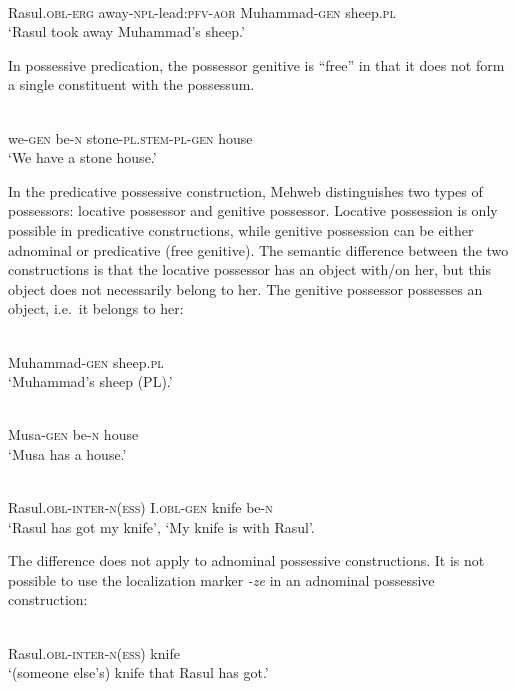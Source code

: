 ﻿\documentclass[output=paper]{langsci/langscibook}
\begin{document}
\ea
{}\\
Rasul.\textsc{obl}-\textsc{erg} away-\textsc{npl}-lead:\textsc{pfv}-\textsc{aor} Muhammad-\textsc{gen} sheep.\textsc{pl}\\
\glt `Rasul took away Muhammad's sheep.'
\z

In possessive predication, the possessor genitive is ``free'' in that it
does not form a single constituent with the possessum.

\ea
{}\\
we-\textsc{gen} be-\textsc{n} stone-\textsc{pl.stem}-\textsc{pl}-\textsc{gen} house\\
\glt `We have a stone house.'
\z

In the predicative possessive construction, Mehweb distinguishes two types
of possessors: locative possessor and genitive possessor. Locative
possession is only possible in predicative constructions, while genitive
possession can be either adnominal or predicative (free genitive). The
semantic difference between the two constructions is that the locative
possessor has an object with/on her, but this object does not
necessarily belong to her. The genitive possessor possesses an object,
i.e.\ it belongs to her:

\ea
{}\\
Muhammad-\textsc{gen} sheep.\textsc{pl}\\
\glt `Muhammad's sheep (PL).'

\ex
{}\\
Musa-\textsc{gen} be-\textsc{n} house\\
\glt `Musa has a house.'

\ex
{}\\
Rasul.\textsc{obl}-\textsc{inter}-\textsc{n}(\textsc{ess}) I.\textsc{obl}-\textsc{gen} knife be-\textsc{n}\\
\glt `Rasul has got my knife', `My knife is with Rasul'.

\z

The difference does not apply to adnominal possessive constructions. It
is  not possible to use the localization  marker \emph{-ze} in an adnominal
possessive construction:

\ea
{}\\
Rasul.\textsc{obl}-\textsc{inter}-\textsc{n}(\textsc{ess}) knife\\
\glt `(someone else's) knife that Rasul has got.'
\z
\end{document}
